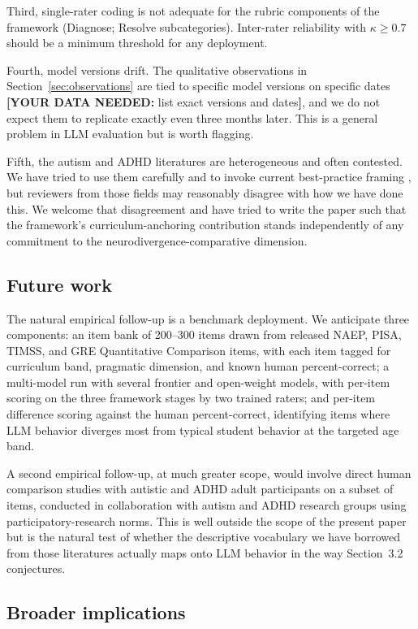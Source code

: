 \documentclass[11pt,letterpaper]{article}
\newcommand{\dataneeded}[1]{{\color{blue}\textbf{[YOUR DATA NEEDED:} #1\textbf{]}}}
\begin{document}
Third, single-rater coding is not adequate for the rubric components of the framework (Diagnose; Resolve subcategories). Inter-rater reliability with $\kappa \geq 0.7$ should be a minimum threshold for any deployment.

Fourth, model versions drift. The qualitative observations in Section~\ref{sec:observations} are tied to specific model versions on specific dates \dataneeded{list exact versions and dates}, and we do not expect them to replicate exactly even three months later. This is a general problem in LLM evaluation but is worth flagging.

Fifth, the autism and ADHD literatures are heterogeneous and often contested. We have tried to use them carefully and to invoke current best-practice framing \citep{bottemabeutel2021, pellicano2022, milton2012}, but reviewers from those fields may reasonably disagree with how we have done this. We welcome that disagreement and have tried to write the paper such that the framework's curriculum-anchoring contribution stands independently of any commitment to the neurodivergence-comparative dimension.

\subsection{Future work}

The natural empirical follow-up is a benchmark deployment. We anticipate three components: an item bank of 200--300 items drawn from released NAEP, PISA, TIMSS, and GRE Quantitative Comparison items, with each item tagged for curriculum band, pragmatic dimension, and known human percent-correct; a multi-model run with several frontier and open-weight models, with per-item scoring on the three framework stages by two trained raters; and per-item difference scoring against the human percent-correct, identifying items where LLM behavior diverges most from typical student behavior at the targeted age band.

A second empirical follow-up, at much greater scope, would involve direct human comparison studies with autistic and ADHD adult participants on a subset of items, conducted in collaboration with autism and ADHD research groups using participatory-research norms. This is well outside the scope of the present paper but is the natural test of whether the descriptive vocabulary we have borrowed from those literatures actually maps onto LLM behavior in the way Section~3.2 conjectures.

\subsection{Broader implications}
\end{document}

